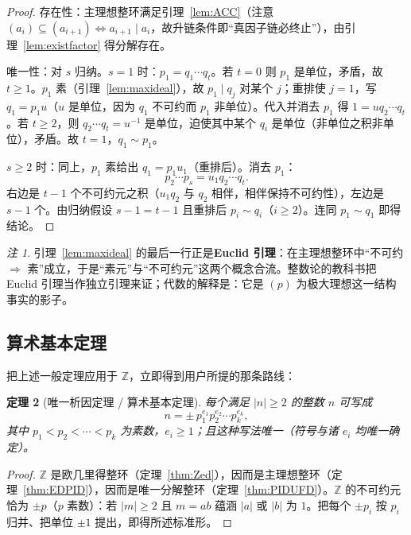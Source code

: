 \documentclass[a4paper,11pt]{ctexart}
\numberwithin{equation}{section}
\theoremstyle{plain}
\newtheorem{theorem}{定理}[section]
\theoremstyle{definition}
\theoremstyle{remark}
\newtheorem{remark}[theorem]{注}
\newcommand{\Z}{\mathbb{Z}}
\begin{document}
\begin{proof}
存在性：主理想整环满足引理~\ref{lem:ACC}（注意 $(a_i)\subseteq(a_{i+1})\iff a_{i+1}\mid a_i$，故升链条件即“真因子链必终止”），由引理~\ref{lem:existfactor} 得分解存在。

唯一性：对 $s$ 归纳。$s=1$ 时：$p_1=q_1\cdots q_t$。若 $t=0$ 则 $p_1$ 是单位，矛盾，故 $t\ge1$。$p_1$ 素（引理~\ref{lem:maxideal}），故 $p_1\mid q_j$ 对某个 $j$；重排使 $j=1$，写 $q_1=p_1u$（$u$ 是单位，因为 $q_1$ 不可约而 $p_1$ 非单位）。代入并消去 $p_1$ 得 $1=uq_2\cdots q_t$。若 $t\ge2$，则 $q_2\cdots q_t=u^{-1}$ 是单位，迫使其中某个 $q_i$ 是单位（非单位之积非单位），矛盾。故 $t=1$，$q_1\sim p_1$。

$s\ge2$ 时：同上，$p_1$ 素给出 $q_1=p_1u_1$（重排后）。消去 $p_1$：
\[
p_2\cdots p_s = u_1 q_2\cdots q_t .
\]
右边是 $t-1$ 个不可约元之积（$u_1q_2$ 与 $q_2$ 相伴，相伴保持不可约性），左边是 $s-1$ 个。由归纳假设 $s-1=t-1$ 且重排后 $p_i\sim q_i$（$i\ge2$）。连同 $p_1\sim q_1$ 即得结论。
\end{proof}

\begin{remark}
引理~\ref{lem:maxideal} 的最后一行正是\textbf{Euclid 引理}：在主理想整环中“不可约 $\Rightarrow$ 素”成立，于是“素元”与“不可约元”这两个概念合流。整数论的教科书把 Euclid 引理当作独立引理来证；代数的解释是：它是 $(p)$ 为极大理想这一结构事实的影子。
\end{remark}

\subsection{算术基本定理}

把上述一般定理应用于 $\Z$，立即得到用户所提的那条路线：

\begin{theorem}[唯一析因定理 / 算术基本定理]\label{thm:FToA}
每个满足 $|n|\ge2$ 的整数 $n$ 可写成
\[
n=\pm\, p_1^{e_1}p_2^{e_2}\cdots p_k^{e_k},
\]
其中 $p_1<p_2<\cdots<p_k$ 为素数，$e_i\ge1$；且这种写法唯一（符号与诸 $e_i$ 均唯一确定）。
\end{theorem}

\begin{proof}
$\Z$ 是欧几里得整环（定理~\ref{thm:Zed}），因而是主理想整环（定理~\ref{thm:EDPID}），因而是唯一分解整环（定理~\ref{thm:PIDUFD}）。$\Z$ 的不可约元恰为 $\pm p$（$p$ 素数）：若 $|m|\ge2$ 且 $m=ab$ 蕴涵 $|a|$ 或 $|b|$ 为 $1$。把每个 $\pm p_i$ 按 $p_i$ 归并、把单位 $\pm1$ 提出，即得所述标准形。
\end{proof}
\end{document}
